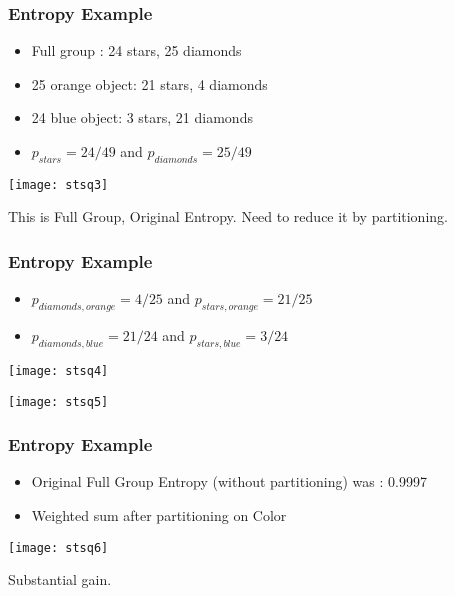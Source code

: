 \begin{frame}[fragile]\frametitle{Entropy Example}

\begin{itemize}
\item Full group : 24 stars, 25 diamonds
\item 25 orange object: 21 stars, 4 diamonds
\item 24 blue object: 3 stars, 21 diamonds
\item $p_{stars} = 24/49$ and  $p_{diamonds} = 25/49$ 
\end{itemize}
\begin{center}
\texttt{[image: stsq3]}
\end{center}
This is Full Group, Original Entropy. Need to reduce it by partitioning.
\end{frame}

\begin{frame}[fragile]\frametitle{Entropy Example}

\begin{itemize}
\item $p_{diamonds, orange} = 4/25$ and  $p_{stars,orange} = 21/25$ 
\item $p_{diamonds, blue} = 21/24$ and  $p_{stars,blue} = 3/24$ 
\end{itemize}

\begin{center}
\texttt{[image: stsq4]} 

\texttt{[image: stsq5]}
\end{center}
\end{frame}

\begin{frame}[fragile]\frametitle{Entropy Example}
\begin{itemize}
\item Original Full Group Entropy (without partitioning) was : 0.9997
\item Weighted sum after partitioning on Color
\end{itemize}
\begin{center}
\texttt{[image: stsq6]}
\end{center}
Substantial gain.
\end{frame}


